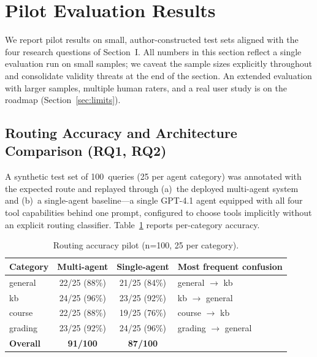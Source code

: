 \documentclass[conference]{IEEEtran}
\begin{document}
\section{Pilot Evaluation Results}
\label{sec:eval}

We report pilot results on small, author-constructed test sets aligned with the four research questions of Section~I. All numbers in this section reflect a single evaluation run on small samples; we caveat the sample sizes explicitly throughout and consolidate validity threats at the end of the section. An extended evaluation with larger samples, multiple human raters, and a real user study is on the roadmap (Section~\ref{sec:limits}).

\subsection{Routing Accuracy and Architecture Comparison (RQ1, RQ2)}

A synthetic test set of 100~queries (25 per agent category) was annotated with the expected route and replayed through (a)~the deployed multi-agent system and (b)~a single-agent baseline---a single GPT-4.1 agent equipped with all four tool capabilities behind one prompt, configured to choose tools implicitly without an explicit routing classifier. Table~\ref{tab:routing} reports per-category accuracy.

\begin{table}[h]
\centering
\caption{Routing accuracy pilot (n=100, 25 per category).}
\label{tab:routing}
\begin{tabular}{lccl}
\toprule
Category & Multi-agent & Single-agent & Most frequent confusion \\
\midrule
general  & 22/25 (88\%) & 21/25 (84\%) & general $\to$ kb \\
kb       & 24/25 (96\%) & 23/25 (92\%) & kb $\to$ general \\
course   & 22/25 (88\%) & 19/25 (76\%) & course $\to$ kb \\
grading  & 23/25 (92\%) & 24/25 (96\%) & grading $\to$ general \\
\midrule
\textbf{Overall} & \textbf{91/100} & \textbf{87/100} & \\
\bottomrule
\end{tabular}
\end{table}
\end{document}
